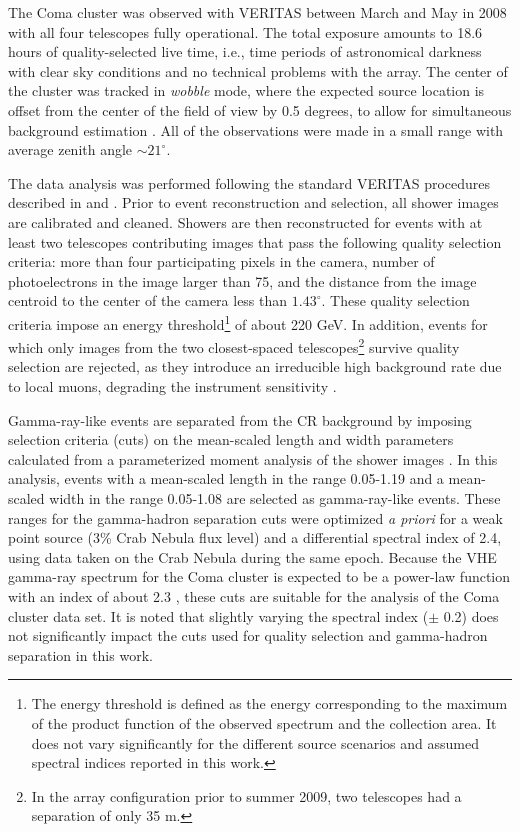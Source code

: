 \documentclass[12pt,manuscript]{aastex}
\begin{document}
The Coma cluster was observed with VERITAS between March and May in 2008 with all four telescopes
fully operational. The total exposure amounts to 18.6 hours of quality-selected live time, i.e.,
time periods of astronomical darkness with clear sky conditions and no technical problems with the
array. The center of the cluster was tracked in \emph{wobble} mode, where the expected source
location is offset from the center of the field of view by 0.5 degrees, to allow for simultaneous
background estimation \citep{article:Fomin_etal:1994}. All of the observations were made in a small
range with average zenith angle $\sim 21^{\circ}$.

The data analysis was performed following the standard VERITAS procedures described in
\citet{inproc:Cogan_etal:2007} and \citet{inproc:Daniel_etal:2007}. Prior to event reconstruction
and selection, all shower images are calibrated and cleaned. Showers are then reconstructed for
events with at least two telescopes contributing images that pass the following quality selection
criteria: more than four participating pixels in the camera, number of photoelectrons in the image
larger than 75, and the distance from the image centroid to the center of the camera less
than $1.43^{\circ}$. These quality selection criteria impose an energy threshold\footnote{The energy
threshold is defined as the energy corresponding to the maximum of the product function of the
observed spectrum and the collection area. It does not vary significantly for the different source
scenarios and assumed spectral indices reported in this work.} of about 220 GeV. In addition,
events for which only images from the two closest-spaced telescopes\footnote{In the array
configuration prior to summer 2009, two telescopes  had a separation of only 35 m.} survive quality
selection are rejected, as they introduce an irreducible high background rate due to local muons, 
degrading the instrument sensitivity \citep{article:MaierKnapp:2007}.

Gamma-ray-like events are separated from the CR background by imposing selection criteria (cuts) on
the mean-scaled length and width parameters \citep{article:Aharonian_etal:1997,
article:Krawczynski_etal:2006} calculated from a parameterized moment analysis of the shower images
\citep{inproc:Hillas:1985}. In this analysis, events with a mean-scaled length in the range 
0.05-1.19 and a mean-scaled width in the range 0.05-1.08 are selected as gamma-ray-like events.
These ranges for the gamma-hadron separation cuts were optimized {\em a priori} for a weak point
source (3\% Crab Nebula flux level) and a differential spectral index of 2.4, using data taken on
the Crab Nebula during the same epoch. Because the VHE gamma-ray spectrum for the Coma cluster is
expected to be a power-law function with an index of about 2.3 \citep{article:PinzkePfrommer:2010},
these cuts are suitable for the analysis of the Coma cluster data set. It is noted that slightly
varying the spectral index ($\pm$ 0.2) does not significantly impact the cuts used for quality
selection and gamma-hadron separation in this work. 
\end{document}
